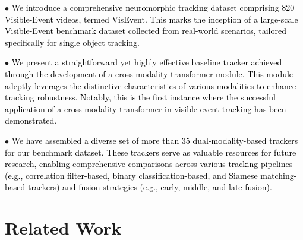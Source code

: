 \documentclass[journal]{IEEEtran}
\begin{document}
$\bullet$ \textcolor{black}{We introduce a comprehensive neuromorphic tracking dataset comprising 820 Visible-Event videos, termed VisEvent. This marks the inception of a large-scale Visible-Event benchmark dataset collected from real-world scenarios, tailored specifically for single object tracking.}

$\bullet$ \textcolor{black}{We present a straightforward yet highly effective baseline tracker achieved through the development of a cross-modality transformer module. This module adeptly leverages the distinctive characteristics of various modalities to enhance tracking robustness. Notably, this is the first instance where the successful application of a cross-modality transformer in visible-event tracking has been demonstrated.} 

$\bullet$ \textcolor{black}{We have assembled a diverse set of more than 35 dual-modality-based trackers for our benchmark dataset. These trackers serve as valuable resources for future research, enabling comprehensive comparisons across various tracking pipelines (e.g., correlation filter-based, binary classification-based, and Siamese matching-based trackers) and fusion strategies (e.g., early, middle, and late fusion).} 












	



\section{Related Work} 
\end{document}
